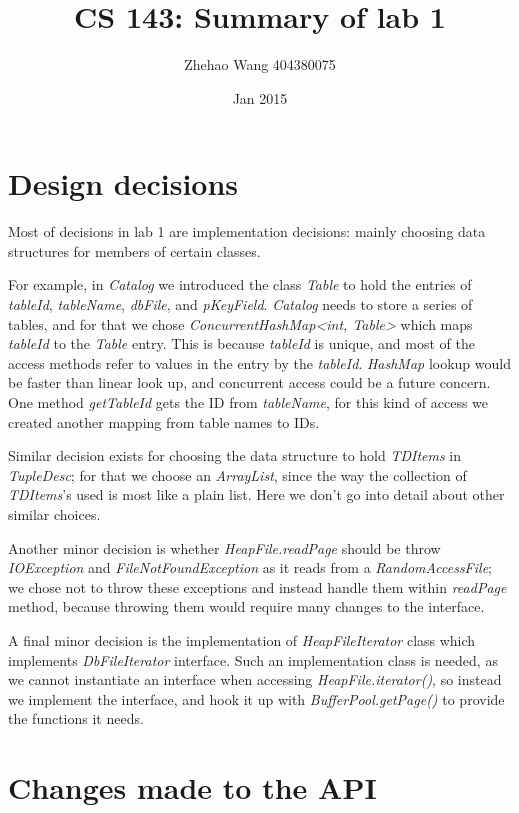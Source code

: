 \documentclass[11pt]{article}
\title{CS 143: Summary of lab 1}
\author{Zhehao Wang  404380075}
\date{Jan 2015}
\begin{document}
\maketitle

\section{Design decisions}

Most of decisions in lab 1 are implementation decisions: mainly choosing data structures for members of certain classes.

For example, in \textit{Catalog} we introduced the class \textit{Table} to hold the entries of \textit{tableId}, \textit{tableName}, \textit{dbFile}, and \textit{pKeyField}. \textit{Catalog} needs to store a series of tables, and for that we chose \textit{ConcurrentHashMap<int, Table>} which maps \textit{tableId} to the \textit{Table} entry. This is because \textit{tableId} is unique, and most of the access methods refer to values in the entry by the \textit{tableId}. \textit{HashMap} lookup would be faster than linear look up, and concurrent access could be a future concern. One method \textit{getTableId} gets the ID from \textit{tableName}, for this kind of access we created another mapping from table names to IDs.

Similar decision exists for choosing the data structure to hold \textit{TDItems} in \textit{TupleDesc}; for that we choose an \textit{ArrayList}, since the way the collection of \textit{TDItems}'s used is most like a plain list. Here we don't go into detail about other similar choices.

Another minor decision is whether \textit{HeapFile.readPage} should be throw \textit{IOException} and \textit{FileNotFoundException} as it reads from a \textit{RandomAccessFile}; we chose not to throw these exceptions and instead handle them within \textit{readPage} method, because throwing them would require many changes to the interface.

A final minor decision is the implementation of \textit{HeapFileIterator} class which implements \textit{DbFileIterator} interface. Such an implementation class is needed, as we cannot instantiate an interface when accessing \textit{HeapFile.iterator()}, so instead we implement the interface, and hook it up with \textit{BufferPool.getPage()} to provide the functions it needs.

\section{Changes made to the API}
\end{document}
